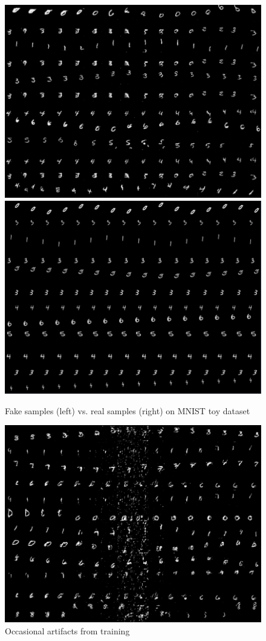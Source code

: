 \documentclass{article}
\begin{document}
{{\begin{figure}[H] \label{fig:abc2}
    \centering
    \includegraphics[width=0.45\linewidth]{imgs/mnist/fake_mnist.png}
    \includegraphics[width=0.45\linewidth]{imgs/mnist/true_mnist.png}
    \caption{Fake samples (left) vs. real samples (right) on MNIST toy dataset}
\end{figure}

\begin{figure}[H] \label{fig:abc}
    \centering
    \includegraphics[width=0.8\linewidth]{imgs/mnist/mnist_artifacts.png}
    \caption{Occasional artifacts from training}
\end{figure}

}}
\end{document}
